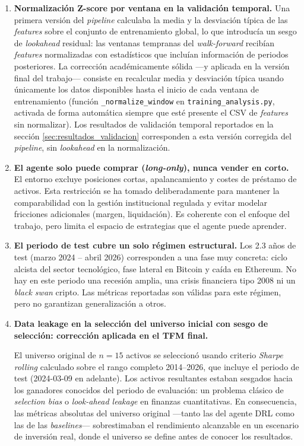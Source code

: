 \documentclass[IB,a4paper]{TFUOC}
\begin{document}
\begin{enumerate}
    \item \textbf{Normalización Z-score por ventana en la validación temporal.} Una primera versión del \textit{pipeline} calculaba la media y la desviación típica de las \textit{features} sobre el conjunto de entrenamiento global, lo que introducía un sesgo de \textit{lookahead} residual: las ventanas tempranas del \textit{walk-forward} recibían \textit{features} normalizadas con estadísticos que incluían información de periodos posteriores. La corrección académicamente sólida —y aplicada en la versión final del trabajo— consiste en recalcular media y desviación típica usando únicamente los datos disponibles hasta el inicio de cada ventana de entrenamiento (función \texttt{\_normalize\_window} en \texttt{training\_analysis.py}, activada de forma automática siempre que esté presente el CSV de \textit{features} sin normalizar). Los resultados de validación temporal reportados en la sección \ref{sec:resultados_validacion} corresponden a esta versión corregida del \textit{pipeline}, sin \textit{lookahead} en la normalización.

    \item \textbf{El agente solo puede comprar (\textit{long-only}), nunca vender en corto.} El entorno excluye posiciones cortas, apalancamiento y costes de préstamo de activos. Esta restricción se ha tomado deliberadamente para mantener la comparabilidad con la gestión institucional regulada y evitar modelar fricciones adicionales (margen, liquidación). Es coherente con el enfoque del trabajo, pero limita el espacio de estrategias que el agente puede aprender.

    \item \textbf{El periodo de test cubre un solo régimen estructural.} Los 2.3 años de test (marzo 2024 -- abril 2026) corresponden a una fase muy concreta: ciclo alcista del sector tecnológico, fase lateral en Bitcoin y caída en Ethereum. No hay en este periodo una recesión amplia, una crisis financiera tipo 2008 ni un \textit{black swan} cripto. Las métricas reportadas son válidas para este régimen, pero no garantizan generalización a otros.

    \item \textbf{Data leakage en la selección del universo inicial con sesgo de selección: corrección aplicada en el TFM final.}

    El universo original de $n=15$ activos se seleccionó usando criterio \textit{Sharpe rolling} calculado sobre el rango completo 2014--2026, que incluye el periodo de test (2024-03-09 en adelante). Los activos resultantes estaban sesgados hacia los ganadores conocidos del periodo de evaluación: un problema clásico de \textit{selection bias} o \textit{look-ahead leakage} en finanzas cuantitativas. En consecuencia, las métricas absolutas del universo original —tanto las del agente DRL como las de las \textit{baselines}— sobrestimaban el rendimiento alcanzable en un escenario de inversión real, donde el universo se define antes de conocer los resultados.


\end{enumerate}
\end{document}
